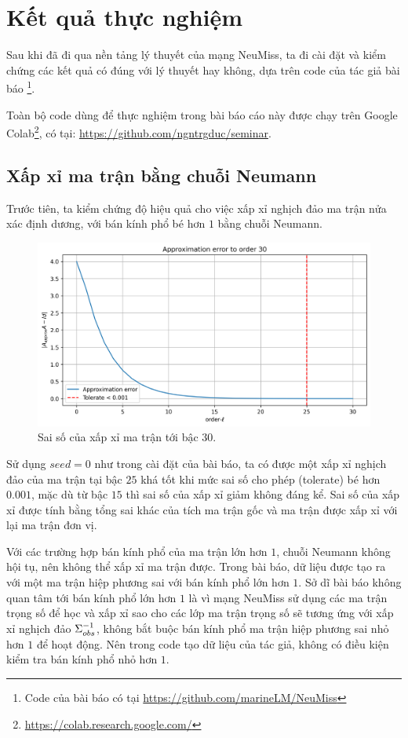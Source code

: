 \section{Kết quả thực nghiệm}
Sau khi đã đi qua nền tảng lý thuyết của mạng NeuMiss, ta đi cài đặt và 
kiểm chứng các kết quả có đúng với lý thuyết hay không, dựa trên code của tác giả bài báo \footnote{Code của bài báo có tại \href{https://github.com/marineLM/NeuMiss}{https://github.com/marineLM/NeuMiss}}.

Toàn bộ code dùng để thực nghiệm trong bài báo cáo này được chạy trên Google Colab\footnote{\href{https://colab.research.google.com/}{https://colab.research.google.com/}},
có tại:
\href{https://github.com/ngntrgduc/seminar}{https://github.com/ngntrgduc/seminar}.


\subsection{Xấp xỉ ma trận bằng chuỗi Neumann}
Trước tiên, ta kiểm chứng độ hiệu quả cho việc xấp xỉ nghịch đảo ma trận nửa xác định dương, với bán kính phổ bé hơn $1$ bằng chuỗi Neumann.

\begin{figure}[h]
    \centering
    \includegraphics[width=.9\textwidth]{img/results/approx_neumann.png}
    \caption{
        Sai số của xấp xỉ ma trận tới bậc $30$.
    }
\end{figure}

Sử dụng $seed = 0$ như trong cài đặt của bài báo, ta có được một xấp xỉ nghịch đảo của ma trận tại bậc $25$ khá tốt khi mức sai số cho phép (tolerate) bé hơn $0.001$, mặc dù từ bậc $15$ thì sai số của xấp xỉ giảm không đáng kể. Sai số của xấp xỉ được tính bằng tổng sai khác của tích ma trận gốc và ma trận được xấp xỉ với lại ma trận đơn vị.
    
Với các trường hợp bán kính phổ của ma trận lớn hơn $1$, chuỗi Neumann không hội tụ, nên không thể xấp xỉ ma trận được. Trong bài báo, dữ liệu được tạo ra với một ma trận hiệp phương sai với bán kính phổ lớn hơn $1$. Sở dĩ bài báo không quan tâm tới bán kính phổ lớn hơn $1$ 
là vì mạng NeuMiss sử dụng các ma trận trọng số để học và xấp xỉ sao cho các lớp ma trận trọng số sẽ tương ứng với xấp xỉ nghịch đảo $\Sigma_{obs}^{-1}$, không bắt buộc bán kính phổ ma trận hiệp phương sai nhỏ hơn $1$ để hoạt động. Nên trong code tạo dữ liệu của tác giả, không có điều kiện kiểm tra bán kính phổ nhỏ hơn $1$.


